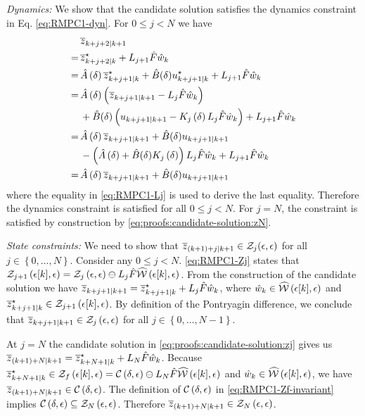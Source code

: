 \noindent\textit{Dynamics:}
%
We show that the candidate solution satisfies the dynamics constraint
in Eq. \eqref{eq:RMPC1-dyn}. For $0\leq j<N$ we have
\begin{align*}
&\overline{z}_{k+j+2| k+1} \\
=\, & \overline{z}_{k+j+2| k}^{\star}+L_{j+1}\hat{F}\hat{w}_{k}\\
=\, &\hat{A}\left(\delta\right)\overline{z}_{k+j+1| k}^{\star}+\hat{B}(\delta)u_{k+j+1| k}^{\star}+L_{j+1}\hat{F}\hat{w}_{k}\\
=\, &\hat{A}\left(\delta\right)\left(\overline{z}_{k+j+1| k+1}-L_{j}\hat{F}\hat{w}_{k}\right) \\
&+\hat{B}(\delta)\left(u_{k+j+1| k+1}-K_{j}\left(\delta\right)L_{j}\hat{F}\hat{w}_{k}\right) +L_{j+1}\hat{F}\hat{w}_{k} \\
=\, &\hat{A}\left(\delta\right)\overline{z}_{k+j+1| k+1}+\hat{B}(\delta)u_{k+j+1| k+1} \\
&-\left(\hat{A}\left(\delta\right) + \hat{B}(\delta)K_{j}\left(\delta\right)\right)L_{j}\hat{F}\hat{w}_{k}+L_{j+1}\hat{F}\hat{w}_{k}\\
=\, &\hat{A}\left(\delta\right)\overline{z}_{k+j+1| k+1}+\hat{B}(\delta)u_{k+j+1| k+1}
\end{align*}
where the equality in \eqref{eq:RMPC1-Lj} is used to derive the last
equality. %
Therefore the dynamics constraint
is satisfied for all $0\leq j<N$. For $j=N$, the constraint is satisfied
by construction by \eqref{eq:proofs:candidate-solution:zN}.


\noindent\textit{State constraints:}
%
We need to show that $\overline{z}_{(k+1)+j| k+1}\in\mathcal{Z}_{j}\text{\ensuremath{\left(\epsilon,\epsilon\right)}}$
for all $j\in\left\{ 0,\dots,N\right\} $. Consider any $0\leq j<N$.
\eqref{eq:RMPC1-Zj} states that $\mathcal{Z}_{j+1}\left(\epsilon[k],\epsilon\right)=\mathcal{Z}_{j}\left(\epsilon,\epsilon\right)\ominus L_{j}\hat{F}\widehat{\mathcal{W}}\left(\epsilon[k],\epsilon\right)$.
From the construction of the candidate solution we have $\overline{z}_{k+j+1| k+1}=\overline{z}_{k+j+1| k}^{\star}+L_{j}\hat{F}\hat{w}_{k}$,
where $\hat{w}_{k}\in\widehat{\mathcal{W}}\left(\epsilon[k],\epsilon\right)$ and $\overline{z}_{k+j+1| k}^{\star}\in\mathcal{Z}_{j+1}\left(\epsilon[k],\epsilon\right)$.
By definition of the Pontryagin difference, we conclude that $\overline{z}_{k+j+1| k+1}\in\mathcal{Z}_{j}\left(\epsilon,\epsilon\right)$
for all $j\in\left\{ 0,\dots,N-1\right\} $.

At $j=N$ the candidate solution in \eqref{eq:proofs:candidate-solution:zj}
gives us $\overline{z}_{(k+1)+N| k+1}=\overline{z}_{k+N+1| k}^{\star}+L_{N}\hat{F}\hat{w}_{k}$.
Because $\overline{z}_{k+N+1| k}^{\star}\in\mathcal{Z}_{f}\left(\epsilon[k],\epsilon\right)=\mathcal{C}\left(\delta,\epsilon\right)\ominus L_{N}\hat{F}\widehat{\mathcal{W}}\left(\epsilon[k],\epsilon\right)$
and $\hat{w}_{k}\in\widehat{\mathcal{W}}\left(\epsilon[k],\epsilon\right)$, we have
$\overline{z}_{(k+1)+N| k+1}\in\mathcal{C}\left(\delta,\epsilon\right)$. The
definition of $\mathcal{C}\left(\delta,\epsilon\right)$ in \eqref{eq:RMPC1-Zf-invariant}
implies $\mathcal{C}\left(\delta,\epsilon\right)\subseteq\mathcal{Z}_{N}\left(\epsilon,\epsilon\right)$.
Therefore $\overline{z}_{(k+1)+N| k+1}\in\mathcal{Z}_{N}\left(\epsilon,\epsilon\right)$.


